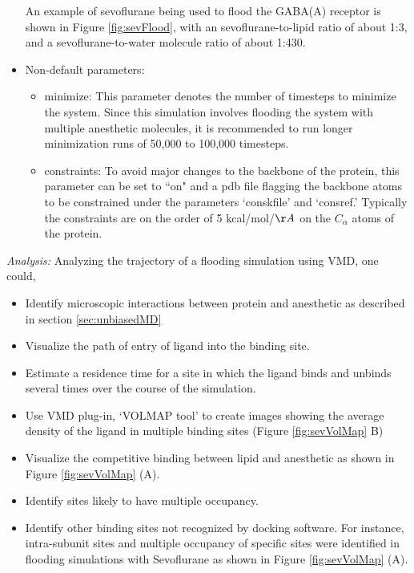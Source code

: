 \documentclass[12pt]{article}
\begin{document}
\begin{itemize}
An example of sevoflurane being used to flood the GABA(A) receptor is shown in Figure \ref{fig:sevFlood}, with an sevoflurane-to-lipid ratio of about 1:3, and a sevoflurane-to-water molecule ratio of about 1:430.
  \item Non-default parameters: 
  	\begin{itemize}
 	 \item minimize: This parameter denotes the number of timesteps to minimize the system. Since this simulation involves flooding the system with multiple anesthetic molecules, it is recommended to run longer minimization runs of 50,000 to 100,000 timesteps.
	 \item constraints: To avoid major changes to the backbone of the protein, this parameter can be set to ``on" and a pdb file flagging the backbone atoms to be constrained under the parameters `conskfile' and `consref.' Typically the constraints are on the order of 5 kcal/mol/$\AA$ on the $C_{\alpha}$ atoms of the protein.
	 \end{itemize}
\end{itemize} \hfill \break
\textit {Analysis:}
	Analyzing the trajectory of a flooding simulation using VMD, one could,
	\begin{itemize}
	 \item Identify microscopic interactions between protein and anesthetic as described in section \ref{sec:unbiasedMD}
	 \item Visualize the path of entry of ligand into the binding site.
	 \item Estimate a residence time for a site in which the ligand binds and unbinds several times over the course of the simulation. 
	 \item Use VMD plug-in,  `VOLMAP tool'  to create images showing the average density of the ligand in multiple binding sites (Figure \ref{fig:sevVolMap} B)
	 \item Visualize the competitive binding between lipid and anesthetic as shown in Figure \ref{fig:sevVolMap} (A). 
	 \item Identify sites likely to have multiple occupancy.  
	 \item Identify other binding sites not recognized by docking software. For instance, intra-subunit sites and multiple occupancy of specific sites were identified in flooding simulations with Sevoflurane as shown in Figure \ref{fig:sevVolMap} (A).
	\end{itemize}
\end{document}
